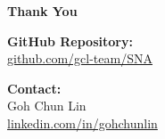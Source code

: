 \documentclass[11pt, aspectratio=169]{beamer}
\begin{document}
\begin{frame}
    \begin{center}
        \textbf{Thank You}
        \vspace{2em}
        
        \textbf{GitHub Repository:} \\
        \href{https://github.com/gcl-team/SNA}{github.com/gcl-team/SNA}
        
        \vspace{1em}
        \textbf{Contact:} \\
        Goh Chun Lin \\
        \href{https://www.linkedin.com/in/gohchunlin}{linkedin.com/in/gohchunlin}
    \end{center}
\end{frame}
\end{document}
